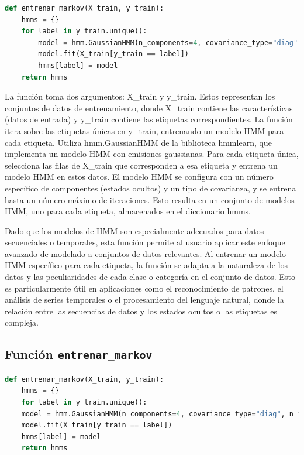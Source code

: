 \documentclass[12pt]{article}
\begin{document}
\begin{lstlisting}[language=Python]
def entrenar_markov(X_train, y_train):
	hmms = {}
	for label in y_train.unique():
		model = hmm.GaussianHMM(n_components=4, covariance_type="diag", n_iter=100)
		model.fit(X_train[y_train == label])
		hmms[label] = model
	return hmms

\end{lstlisting}
\vspace{1cm}

La función toma dos argumentos: X\_train y y\_train. Estos representan los conjuntos de datos de entrenamiento, donde X\_train contiene las características (datos de entrada) y y\_train contiene las etiquetas correspondientes. La función itera sobre las etiquetas únicas en y\_train, entrenando un modelo HMM para cada etiqueta. Utiliza hmm.GaussianHMM de la biblioteca hmmlearn, que implementa un modelo HMM con emisiones gaussianas. Para cada etiqueta única, selecciona las filas de X\_train que corresponden a esa etiqueta y entrena un modelo HMM en estos datos. El modelo HMM se configura con un número específico de componentes (estados ocultos) y un tipo de covarianza, y se entrena hasta un número máximo de iteraciones. Esto resulta en un conjunto de modelos HMM, uno para cada etiqueta, almacenados en el diccionario hmms.\vspace{1cm}


Dado que los modelos de HMM son especialmente adecuados para datos secuenciales o temporales, esta función permite al usuario aplicar este enfoque avanzado de modelado a conjuntos de datos relevantes. Al entrenar un modelo HMM específico para cada etiqueta, la función se adapta a la naturaleza de los datos y las peculiaridades de cada clase o categoría en el conjunto de datos. Esto es particularmente útil en aplicaciones como el reconocimiento de patrones, el análisis de series temporales o el procesamiento del lenguaje natural, donde la relación entre las secuencias de datos y los estados ocultos o las etiquetas es compleja.

\vspace{1cm}

\subsection*{Función \texttt{entrenar\_markov}}
\vspace{1cm}

\begin{lstlisting}[language=Python]
	def entrenar_markov(X_train, y_train):
	hmms = {}
	for label in y_train.unique():
	model = hmm.GaussianHMM(n_components=4, covariance_type="diag", n_iter=100)
	model.fit(X_train[y_train == label])
	hmms[label] = model
	return hmms
	
\end{lstlisting}
\vspace{1cm}
\end{document}
